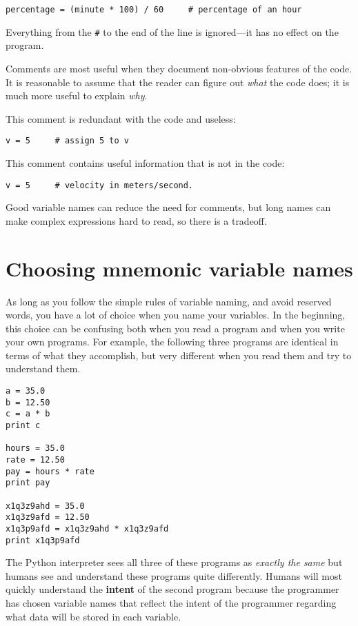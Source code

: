 \begin{ex}
\beforeverb
\begin{verbatim}
percentage = (minute * 100) / 60     # percentage of an hour
\end{verbatim}
\afterverb
%
Everything from the {\tt \#} to the end of the line is ignored---it
has no effect on the program.

Comments are most useful when they document non-obvious features of
the code.  It is reasonable to assume that the reader can figure out
\emph{what} the code does; it is much more useful to explain \emph{why}.

This comment is redundant with the code and useless:

\beforeverb
\begin{verbatim}
v = 5     # assign 5 to v
\end{verbatim}
\afterverb
%
This comment contains useful information that is not in the code:

\beforeverb
\begin{verbatim}
v = 5     # velocity in meters/second. 
\end{verbatim}
\afterverb
%
Good variable names can reduce the need for comments, but
long names can make complex expressions hard to read, so there is
a tradeoff.

\section{Choosing mnemonic variable names}


As long as you follow the simple rules of variable naming, and avoid
reserved words, you have a lot of choice when you name your variables.
In the beginning, this choice can be confusing both when you read a 
program and when you write your own programs.  For example, the
following three programs are identical in terms of what they accomplish,
but very different when you read them and try to understand them.

\beforeverb
\begin{verbatim}
a = 35.0
b = 12.50
c = a * b
print c

hours = 35.0
rate = 12.50
pay = hours * rate
print pay

x1q3z9ahd = 35.0
x1q3z9afd = 12.50
x1q3p9afd = x1q3z9ahd * x1q3z9afd
print x1q3p9afd
\end{verbatim}
\afterverb
%
The Python interpreter sees all three of these programs as \emph{exactly the 
same} but humans see and understand these programs quite differently.  
Humans will most quickly understand the {\bf intent} 
of the second program because the 
programmer has chosen variable names that reflect the intent of the programmer
regarding what data will be stored in each variable.


\end{ex}
